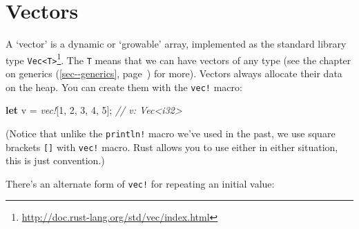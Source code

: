 \documentclass[a4paper,]{book}
\renewcommand*{\hypertarget}[3][\ar]{%
  \def\ar{#2}%
  \label{#1}%
  #3}
\renewcommand*{\hyperlink}[2]{%
 #2 (\autoref{#1}, page~\pageref{#1})}
\newenvironment{Shaded}{\begin{snugshade}}{\end{snugshade}}
\newcommand{\KeywordTok}[1]{\textcolor[rgb]{0.13,0.29,0.53}{\textbf{{#1}}}}
\newcommand{\DecValTok}[1]{\textcolor[rgb]{0.00,0.00,0.81}{{#1}}}
\newcommand{\StringTok}[1]{\textcolor[rgb]{0.31,0.60,0.02}{{#1}}}
\newcommand{\CommentTok}[1]{\textcolor[rgb]{0.56,0.35,0.01}{\textit{{#1}}}}
\newcommand{\OtherTok}[1]{\textcolor[rgb]{0.56,0.35,0.01}{{#1}}}
\newcommand{\PreprocessorTok}[1]{\textcolor[rgb]{0.56,0.35,0.01}{\textit{{#1}}}}
\newcommand{\NormalTok}[1]{{#1}}
\renewcommand{\href}[2]{#2\footnote{\url{#1}}}
\begin{document}
\begin{Shaded}
\end{Shaded}

\hypertarget{sec--vectors}{\section{Vectors}\label{sec--vectors}}

A `vector' is a dynamic or `growable' array, implemented as the standard
library type
\href{http://doc.rust-lang.org/std/vec/index.html}{\texttt{Vec\textless{}T\textgreater{}}}.
The \texttt{T} means that we can have vectors of any type (see the
chapter on \protect\hyperlink{sec--generics}{generics} for more).
Vectors always allocate their data on the heap. You can create them with
the \texttt{vec!} macro:

\begin{Shaded}
\begin{Highlighting}[]
\KeywordTok{let} \NormalTok{v = }\PreprocessorTok{vec!}\NormalTok{[}\DecValTok{1}\NormalTok{, }\DecValTok{2}\NormalTok{, }\DecValTok{3}\NormalTok{, }\DecValTok{4}\NormalTok{, }\DecValTok{5}\NormalTok{]; }\CommentTok{// v: Vec<i32>}
\end{Highlighting}
\end{Shaded}

(Notice that unlike the \texttt{println!} macro we've used in the past,
we use square brackets \texttt{{[}{]}} with \texttt{vec!} macro. Rust
allows you to use either in either situation, this is just convention.)

There's an alternate form of \texttt{vec!} for repeating an initial
value:
\end{document}
